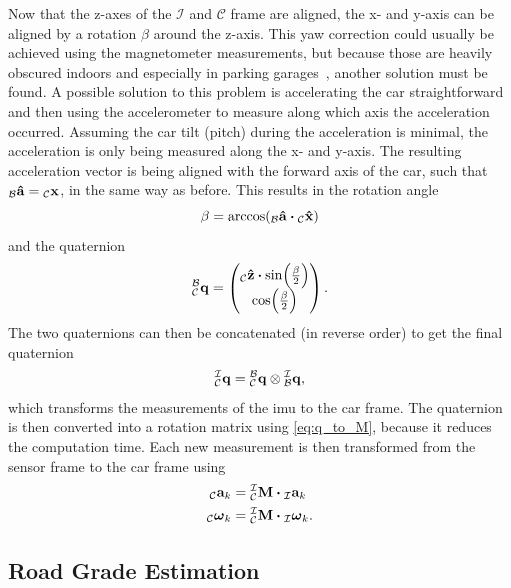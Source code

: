 Now that the z-axes of the $\mathcal{I}$ and $\mathcal{C}$ frame are aligned, the x- and y-axis can be aligned by a rotation $\beta$ around the z-axis.
This yaw correction could usually be achieved using the magnetometer measurements, but because those are heavily obscured indoors and especially in parking garages~\cite{Li2012}, another solution must be found.
A possible solution to this problem is accelerating the car straightforward and then using the accelerometer to measure along which axis the acceleration occurred.
Assuming the car tilt (pitch) during the acceleration is minimal, the acceleration is only being measured along the x- and y-axis.
The resulting acceleration vector is being aligned with the forward axis of the car, such that $\vincs{\hat{a}}{b} = \vincs{x}{c}$, in the same way as before.
This results in the rotation angle
\begin{equation}
    \beta = \arccos(\vincs{\vu{a}}{b} \vdot \vincs{\hat{x}}{c})
\end{equation}
and the quaternion
\begin{equation}
    \qtf{b}{c} =
    \begin{pmatrix}
        \vincs{\hat{z}}{c}\vdot\sin(\frac{\beta}{2}) \\
        \cos(\frac{\beta}{2})
    \end{pmatrix}.
\end{equation}
The two quaternions can then be concatenated (in reverse order) to get the final quaternion
\begin{equation}
    \qtf{i}{c} = \qtf{b}{c} \otimes  \qtf{i}{b},
\end{equation}
which transforms the measurements of the \gls{imu} to the car frame.
The quaternion is then converted into a rotation matrix using \cref{eq:q_to_M}, because it reduces the computation time.
Each new measurement is then transformed from the sensor frame to the car frame using
\begin{align}
    {}_{\mathcal{C}}\mathbf{a}_k                   & = \mtf{i}{c} \vdot {}_{\mathcal{I}}\mathbf{a}_k                    \\
    {}_{\mathcal{C}}\mathbf{\boldsymbol{\omega}}_k & = \mtf{i}{c} \vdot {}_{\mathcal{I}}\mathbf{\boldsymbol{\omega}}_k.
\end{align}


\subsection{Road Grade Estimation}
\label{ssec:road_grade_estimation_imu}
